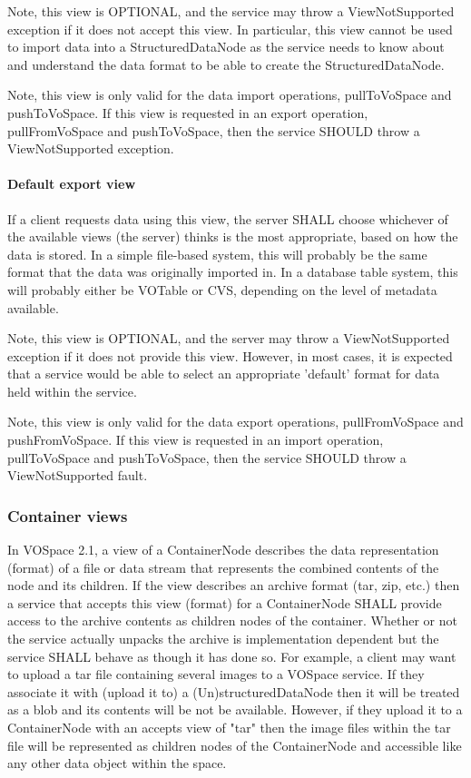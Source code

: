 \documentclass[11pt,a4paper]{ivoa}
\begin{document}
Note, this view is OPTIONAL, and the service may throw a ViewNotSupported exception if it does not accept this view. In particular, this view cannot be used to import data into a StructuredDataNode as the service needs to know about and understand the data format to be able to create the StructuredDataNode.

Note, this view is only valid for the data import operations, pullToVoSpace and pushToVoSpace. If this view is requested in an export operation, pullFromVoSpace and pushToVoSpace, then the service SHOULD throw a ViewNotSupported exception.

\paragraph{Default export view}
If a client requests data using this view, the server SHALL choose whichever of the available views (the server) thinks is the most appropriate, based on how the data is stored. In a simple file-based system, this will probably be the same format that the data was originally imported in. In a database table system, this will probably either be VOTable or CVS, depending on the level of metadata available.

Note, this view is OPTIONAL, and the server may throw a ViewNotSupported exception if it does not provide this view. However, in most cases, it is expected that a service would be able to select an appropriate 'default' format for data held within the service.

Note, this view is only valid for the data export operations, pullFromVoSpace and pushFromVoSpace. If this view is requested in an import operation, pullToVoSpace and pushToVoSpace, then the service SHOULD throw a ViewNotSupported fault.

\subsubsection{Container views}
\label{subsubsec:container views}
In VOSpace 2.1, a view of a ContainerNode describes the data representation (format) of a file or data stream that represents the combined contents of the node and its children. If the view describes an archive format (tar, zip, etc.) then a service that accepts this view (format) for a ContainerNode SHALL provide access to the archive contents as children nodes of the container. Whether or not the service actually unpacks the archive is implementation dependent but the service SHALL behave as though it has done so. For example, a client may want to upload a tar file containing several images to a VOSpace service. If they associate it with (upload it to) a (Un)structuredDataNode then it will be treated as a blob and its contents will be not be available. However, if they upload it to a ContainerNode with an accepts view of "tar" then the image files within the tar file will be represented as children nodes of the ContainerNode and accessible like any other data object within the space.
\end{document}
